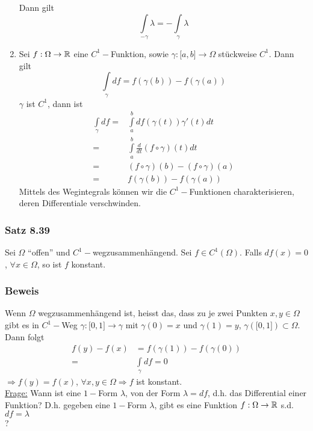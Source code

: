 \begin{enumerate}[\indent E1)]
Dann gilt \[\int\limits_{ - \gamma } \lambda   =  - \int\limits_\gamma  \lambda  \]
\item Sei $f:\Omega\to\mathbb{R}$ eine $C^1-$Funktion, sowie $\gamma:\lbrack a,b\rbrack\to\Omega$ stückweise $C^1$. Dann gilt \[\int\limits_\gamma  {df}  = f\left( {\gamma \left( b \right)} \right) - f\left( {\gamma \left( a \right)} \right)\]
$\gamma$ ist $C^1$, dann ist
\begin{align*}
\int\limits_\gamma  {df}  = & \int\limits_a^b {df\left( {\gamma \left( t \right)} \right)\gamma '\left( t \right)dt} \\
\mathop  = & \int\limits_a^b {\frac{d}{{dt}}\left( {f \circ \gamma } \right)\left( t \right)dt}\\
 = &\left( {f \circ \gamma } \right)\left( b \right) - \left( {f \circ \gamma } \right)\left( a \right)\\
 = & f\left( {\gamma \left( b \right)} \right) - f\left( {\gamma \left( a \right)} \right)
\end{align*}
Mittels des Wegintegrals können wir die $C^1-$Funktionen charakterisieren, deren Differentiale verschwinden.
\end{enumerate}

\subsubsection*{Satz 8.39}
Sei $\Omega$ ``offen'' und $C^1-$wegzusammenhängend. Sei $f\in C^1\left(\Omega\right)$. Falls $df(x)=0$, $\forall x\in\Omega$, so ist $f$ konstant.
\subsubsection*{Beweis}
Wenn $\Omega$ wegzusammenhängend ist, heisst das, dass zu je zwei Punkten $x,y\in\Omega$ gibt es in $C^1-$Weg $\gamma :\lbrack 0,1\rbrack\to\gamma$ mit $\gamma(0)=x$ und $\gamma(1)=y$, $\gamma\left(\lbrack 0,1\rbrack\right)\subset\Omega$. Dann folgt
\begin{align*}
f(y)-f(x)&= f\left(\gamma(1)\right)-f\left(\gamma(0)\right)\\
= &\int\limits_{\gamma} df = 0
\end{align*}
$\Rightarrow f(y)=f(x)$, $\forall x,y\in\Omega\Rightarrow f$ ist konstant.\\

\noindent\underline{Frage:} Wann ist eine $1-$Form $\lambda$, von der Form $\lambda = df$, d.h. das Differential einer Funktion? D.h. gegeben eine $1-$Form $\lambda$, gibt es eine Funktion $f:\Omega\to\mathbb{R}$ s.d. $df=\lambda$\\?

